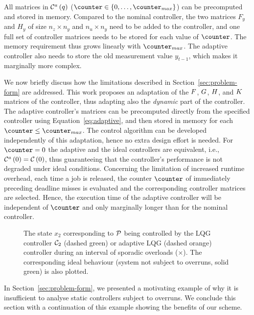 All matrices in $\mathcal{C}^a\left( q \right)$ ($\counter \in \{0, \ldots, \counter_{max}\}$) can be precomputed and stored in memory.
Compared to the nominal controller, the two matrices $F_y$ and $H_y$ of size $n_z \times n_y$ and $n_u \times n_y$ need to be added to the controller, and one full set of controller matrices needs to be stored for each value of $\counter$.
The memory requirement thus grows linearly with $\counter_{max}$.
The adaptive controller also needs to store the old measurement value $y_{t-1}$, which makes it marginally more complex.

We now briefly discuss how the limitations described in Section~\ref{sec:problem-form} are addressed.
This work proposes an adaptation of the $F$, $G$, $H$, and $K$ matrices of the controller, thus adapting also the \emph{dynamic} part of the controller.
The adaptive controller's matrices can be precomputed directly from the specified controller using Equation~\eqref{eq:adaptive}, and then stored in memory for each $\counter \leq \counter_{max}$.
The control algorithm can be developed independently of this adaptation, hence no extra design effort is needed.
For $\counter=0$ the adaptive and the ideal controllers are equivalent, i.e., $\mathcal{C}^a\left( 0 \right) = \mathcal{C}\left( 0 \right)$, thus guaranteeing that the controller's performance is not degraded under ideal conditions.
Concerning the limitation of increased runtime overhead, each time a job is released, the counter $\counter$ of immediately preceding deadline misses is evaluated and the corresponding controller matrices are selected.
Hence, the execution time of the adaptive controller will be independent of $\counter$ and only marginally longer than for the nominal controller.

\begin{figure}[tp!]
    \centerline{}
    \caption{The state $x_2$ corresponding to $\mathcal{P}$ being controlled by the LQG controller $\mathcal{C}_2$ (dashed green) or adaptive LQG (dashed orange) controller during an interval of sporadic overloads ($\times$).
    The corresponding ideal behaviour (system not subject to overruns, solid green) is also plotted.}
    \label{fig:lqgs-lqgd}
\end{figure}

In Section~\ref{sec:problem-form}, we presented a motivating example of why it is insufficient to analyse static controllers subject to overruns.
We conclude this section with a continuation of this example showing the benefits of our scheme.

